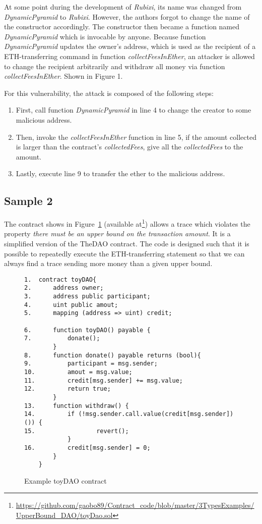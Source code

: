 \documentclass[sigconf,review,anonymous]{acmart}
\begin{document}
At some point during the development of \emph{Rubixi}, its name was changed from \emph{DynamicPyramid} to \emph{Rubixi}. However, the authors forgot to change the name of the constructor accordingly. The constructor then became a function named  \emph{DynamicPyramid} which is invocable by anyone. Because function \emph{DynamicPyramid} updates the owner's address, which is used as the recipient of a ETH-transferring command in function \emph{collectFeesInEther}, an attacker is allowed to change the recipient arbitrarily and withdraw all money via function \emph{collectFeesInEther}. Shown in Figure 1.

For this vulnerability, the attack is composed of the following steps:

\begin{enumerate}
\item First, call function \emph{DynamicPyramid} in line 4 to change the creator to some malicious address.

\item Then, invoke the \emph{collectFeesInEther} function in line 5, if the amount collected is larger than the contract's \emph{collectedFees}, give all the \emph{collectedFees} to the amount.

\item Lastly, execute line 9 to transfer the ether to the malicious address. 
\end{enumerate}


\subsection{Sample 2} The contract shows in Figure~\ref{sample2} (available at\footnote{\url{https://github.com/gaobo89/Contract_code/blob/master/3TypesExamples/UpperBound_DAO/toyDao.sol}}) allows a trace which violates the property \emph{there must be an upper bound on the transaction amount}. It is a simplified version of the TheDAO contract. The code is designed such that it is possible to repeatedly execute the ETH-transferring statement so that we can always find a trace sending more money than a given upper bound.

\begin{figure}
	{\footnotesize
	\begin{verbatim}
1.	contract toyDAO{
2.	    address owner;
3.	    address public participant;
4.	    uint public amout;
5.	    mapping (address => uint) credit;

6.	    function toyDAO() payable {
7.	        donate();		
        }
8.	    function donate() payable returns (bool){
9.	        participant = msg.sender;
10.	        amout = msg.value;
11.	        credit[msg.sender] += msg.value;
12.	        return true;
        }
13.	    function withdraw() {
14.	        if (!msg.sender.call.value(credit[msg.sender])()) {
15.       	        revert();
            }
16.	        credit[msg.sender] = 0;
        }
    }
\end{verbatim}}
\caption{Example toyDAO contract}
\label{sample2}
\end{figure}
\end{document}
